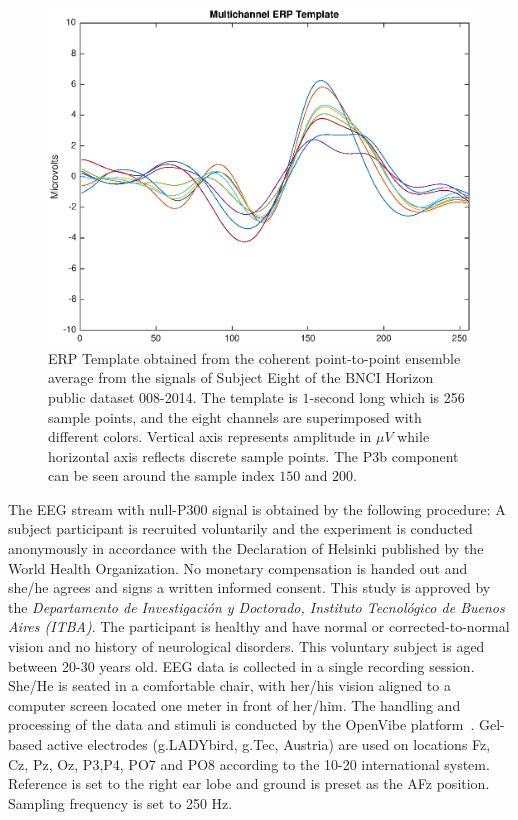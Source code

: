 \begin{figure}[h!]
\centering
\includegraphics[width=12cm]{images/erptemplate1.eps}
\caption[P300 ERP Template]{ERP Template obtained from the coherent point-to-point ensemble average from the signals of Subject Eight of the BNCI Horizon public dataset 008-2014. The template is $1$-second long which is 256 sample points, and the eight channels are superimposed with different colors.  Vertical axis represents amplitude in $\mu V$ while horizontal axis reflects discrete sample points. The P3b component can be seen around the sample index $150$ and $200$.}
\label{fig:erptemplate1}
\end{figure}

The EEG stream with null-P300 signal is obtained by the following procedure: 
A subject participant is recruited voluntarily and the experiment is conducted anonymously in accordance with the Declaration of Helsinki published by the World Health Organization.  No monetary compensation is handed out and she/he agrees and signs a written informed consent.  This study is approved by the \textit{Departamento de Investigación y Doctorado, Instituto Tecnológico de Buenos Aires (ITBA)}.  The participant is healthy and have normal or corrected-to-normal vision and no history of neurological disorders. This voluntary subject is aged between 20-30 years old.  EEG data is collected in a single recording session. She/He is seated in a comfortable chair, with her/his vision aligned to a computer screen located one meter in front of her/him.  The handling and processing of the data and stimuli is conducted by the OpenVibe platform~\cite{Renard2010}.  Gel-based active electrodes (g.LADYbird, g.Tec, Austria) are used on locations Fz, Cz, Pz, Oz, P3,P4, PO7 and PO8 according to the 10-20 international system.  Reference is set to the right ear lobe and ground is preset as the AFz position.   Sampling frequency is set to 250 Hz.

